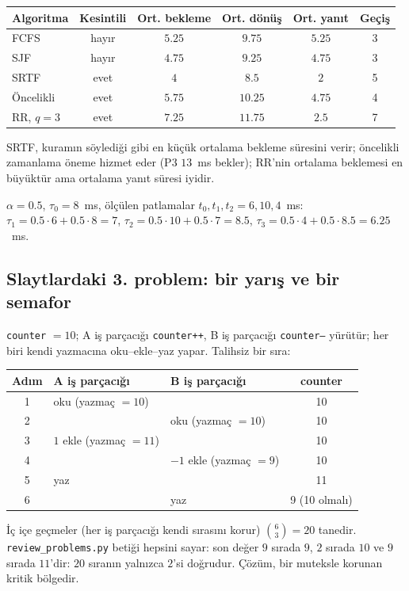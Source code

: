 \documentclass[11pt,a4paper]{article}
\begin{document}
\begin{center}
\renewcommand{\arraystretch}{1.2}
\begin{tabular}{@{}lccccc@{}}
\toprule
\textbf{Algoritma} & \textbf{Kesintili} & \textbf{Ort. bekleme} & \textbf{Ort. dönüş} & \textbf{Ort. yanıt} & \textbf{Geçiş}\\
\midrule
FCFS & hayır & $5.25$ & $9.75$ & $5.25$ & 3\\
SJF & hayır & $4.75$ & $9.25$ & $4.75$ & 3\\
SRTF & evet & $4$ & $8.5$ & $2$ & 5\\
Öncelikli & evet & $5.75$ & $10.25$ & $4.75$ & 4\\
RR, $q=3$ & evet & $7.25$ & $11.75$ & $2.5$ & 7\\
\bottomrule
\end{tabular}
\end{center}
SRTF, kuramın söylediği gibi en küçük ortalama bekleme süresini verir; öncelikli zamanlama öneme hizmet eder (P3 $13$~ms bekler); RR'nin ortalama beklemesi en büyüktür ama ortalama yanıt süresi iyidir.

\begin{example}
$\alpha = 0.5$, $\tau_0 = 8$~ms, ölçülen patlamalar $t_0, t_1, t_2 = 6, 10, 4$~ms: $\tau_1 = 0.5\cdot6 + 0.5\cdot8 = 7$, $\tau_2 = 0.5\cdot10 + 0.5\cdot7 = 8.5$, $\tau_3 = 0.5\cdot4 + 0.5\cdot8.5 = 6.25$~ms.
\end{example}

\subsection{Slaytlardaki 3. problem: bir yarış ve bir semafor}
\texttt{counter} $= 10$; A iş parçacığı \texttt{counter++}, B iş parçacığı \texttt{counter--} yürütür; her biri kendi yazmacına oku--ekle--yaz yapar. Talihsiz bir sıra:
\begin{center}
\renewcommand{\arraystretch}{1.15}
\begin{tabular}{@{}cllc@{}}
\toprule
\textbf{Adım} & \textbf{A iş parçacığı} & \textbf{B iş parçacığı} & \textbf{counter}\\
\midrule
1 & oku (yazmaç $=10$) & & 10\\
2 & & oku (yazmaç $=10$) & 10\\
3 & $1$ ekle (yazmaç $=11$) & & 10\\
4 & & $-1$ ekle (yazmaç $=9$) & 10\\
5 & yaz & & 11\\
6 & & yaz & 9 (10 olmalı)\\
\bottomrule
\end{tabular}
\end{center}
İç içe geçmeler (her iş parçacığı kendi sırasını korur) $\binom{6}{3} = 20$ tanedir. \texttt{review\_problems.py} betiği hepsini sayar: son değer $9$ sırada $9$, $2$ sırada $10$ ve $9$ sırada $11$'dir: $20$ sıranın yalnızca $2$'si doğrudur. Çözüm, bir muteksle korunan kritik bölgedir.
\end{document}
